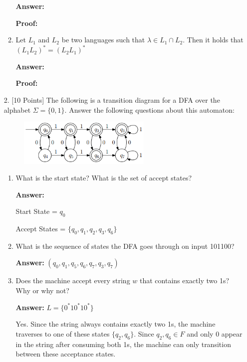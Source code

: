 \documentclass[12pt]{article}
\begin{document}
\begin{enumerate}
\begin{enumerate}
		            \noindent \textbf{Answer:}

		            \noindent \textbf{Proof:}

		      \item Let $L_1$ and $L_2$ be two languages such that $\lambda \in L_1 \cap L_2$. Then it holds that $(L_1L_2)^* = (L_2L_1)^*$

		            \noindent \textbf{Answer:}

		            \noindent \textbf{Proof:}

	      \end{enumerate}

	      \newpage

	\item[2.] [10 Points] The following is a transition diagram for a DFA over the alphabet $\Sigma = \{0,1\}$. Answer the following questions about this automaton:

	      \begin{figure}[h!]
		      \centering
		      \includegraphics[width=0.6\textwidth]{img/q2/q2_automata.png}
	      \end{figure}

	      \begin{enumerate}
		      \item What is the start state? What is the set of accept states?

		            \noindent \textbf{Answer:}

		            Start State = $q_0$

		            Accept States = $\{q_0, q_1, q_2, q_3, q_6\}$

		      \item What is the sequence of states the DFA goes through on input 101100?

		            \noindent \textbf{Answer:} $(q_0, q_1, q_5, q_6, q_7, q_3, q_7)$

		      \item Does the machine accept every string $w$ that contains exactly two 1s? Why or why not?

		            \noindent \textbf{Answer:} $L = \{0^*10^*10^* \}$

		            Yes. Since the string always contains exactly two 1s, the machine traverses to one of these states $\{q_2, q_6 \}$. Since $q_2, q_6 \in F$ and only 0 appear in the string after consuming both 1s, the machine can only transition between these acceptance states.


\end{enumerate}
\end{enumerate}
\end{document}
